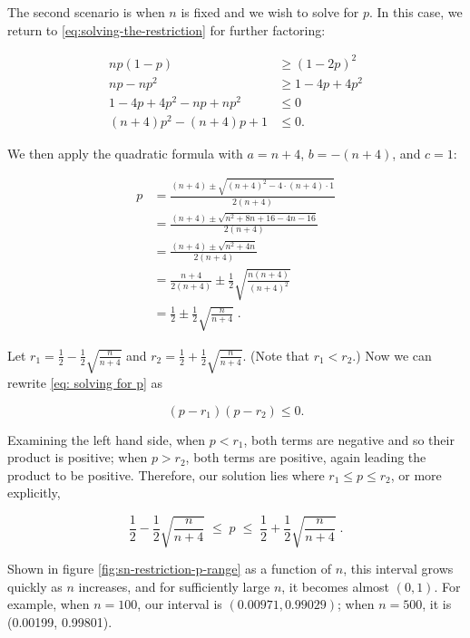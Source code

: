 \documentclass{article}
\begin{document}
The second scenario is when $n$ is fixed and we wish to solve for $p$. In this
case, we return to \eqref{eq:solving-the-restriction} for further factoring:

\begin{align}
  np(1-p) &\geq (1-2p)^2 \nonumber \\
  np - np^2 &\geq 1 - 4p + 4p^2 \nonumber \\
  1 - 4p + 4p^2 - np + np^2 &\leq 0 \nonumber \\
  (n+4)p^2 - (n+4)p + 1 &\leq 0 \label{eq: solving for p}.
\end{align}

We then apply the quadratic formula with $a = n+4$, $b = -(n+4)$, and $c = 1$:

\begin{align*}
  p &= \frac{(n+4) \pm \sqrt{(n+4)^2 - 4 \cdot (n+4) \cdot 1}}{2(n+4)} \\
  &= \frac{(n+4) \pm \sqrt{n^2 + 8n + 16 - 4n - 16}}{2(n+4)} \\
  &= \frac{(n+4) \pm \sqrt{n^2 + 4n}}{2(n+4)} \\
  &= \frac{n+4}{2(n+4)} \pm \frac12 \sqrt{\frac{n(n+4)}{(n+4)^2}} \\
  &= \frac12 \pm \frac12 \sqrt{\frac{n}{n+4}} \;.
\end{align*}

Let $r_1 = \frac12 - \frac12 \sqrt{\frac{n}{n+4}}$ and $r_2 = \frac12 + \frac12
\sqrt{\frac{n}{n+4}}$. (Note that $r_1 < r_2$.) Now we can rewrite \eqref{eq:
solving for p} as

\begin{equation*}
  (p - r_1)(p - r_2) \leq 0.
\end{equation*}

Examining the left hand side, when $p < r_1$, both terms are negative and so
their product is positive; when $p > r_2$, both terms are positive, again
leading the product to be positive. Therefore, our solution lies where $r_1
\leq p \leq r_2$, or more explicitly,

\begin{equation}
 \frac12 - \frac12 \sqrt{\frac{n}{n+4}} \; \leq \; p \; \leq \; \frac12 + \frac12 \sqrt{\frac{n}{n+4}} \;.
\end{equation}

Shown in figure \ref{fig:sn-restriction-p-range} as a function of $n$, this
interval grows quickly as $n$ increases, and for sufficiently large $n$, it
becomes almost $(0, 1)$. For example, when $n=100$, our interval is $(0.00971,
0.99029)$; when $n=500$, it is (0.00199, 0.99801).
\end{document}
